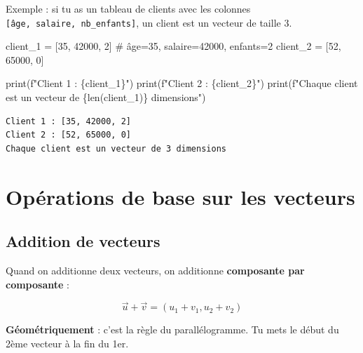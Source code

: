 \documentclass[
  french,
  11pt,
  a4paper,
]{scrbook}
\newenvironment{Shaded}{}{}
\newcommand{\BuiltInTok}[1]{\textcolor[rgb]{0.84,0.23,0.29}{#1}}
\newcommand{\CommentTok}[1]{\textcolor[rgb]{0.42,0.45,0.49}{#1}}
\newcommand{\DecValTok}[1]{\textcolor[rgb]{0.00,0.36,0.77}{#1}}
\newcommand{\NormalTok}[1]{\textcolor[rgb]{0.14,0.16,0.18}{#1}}
\newcommand{\OperatorTok}[1]{\textcolor[rgb]{0.14,0.16,0.18}{#1}}
\newcommand{\SpecialCharTok}[1]{\textcolor[rgb]{0.00,0.36,0.77}{#1}}
\newcommand{\SpecialStringTok}[1]{\textcolor[rgb]{0.01,0.18,0.38}{#1}}
\begin{document}
Exemple : si tu as un tableau de clients avec les colonnes
\texttt{{[}âge,\ salaire,\ nb\_enfants{]}}, un client est un vecteur de
taille 3.

\begin{Shaded}
\begin{Highlighting}[]
\NormalTok{client\_1 }\OperatorTok{=}\NormalTok{ [}\DecValTok{35}\NormalTok{, }\DecValTok{42000}\NormalTok{, }\DecValTok{2}\NormalTok{]   }\CommentTok{\# âge=35, salaire=42000, enfants=2}
\NormalTok{client\_2 }\OperatorTok{=}\NormalTok{ [}\DecValTok{52}\NormalTok{, }\DecValTok{65000}\NormalTok{, }\DecValTok{0}\NormalTok{]}

\BuiltInTok{print}\NormalTok{(}\SpecialStringTok{f"Client 1 : }\SpecialCharTok{\{}\NormalTok{client\_1}\SpecialCharTok{\}}\SpecialStringTok{"}\NormalTok{)}
\BuiltInTok{print}\NormalTok{(}\SpecialStringTok{f"Client 2 : }\SpecialCharTok{\{}\NormalTok{client\_2}\SpecialCharTok{\}}\SpecialStringTok{"}\NormalTok{)}
\BuiltInTok{print}\NormalTok{(}\SpecialStringTok{f"Chaque client est un vecteur de }\SpecialCharTok{\{}\BuiltInTok{len}\NormalTok{(client\_1)}\SpecialCharTok{\}}\SpecialStringTok{ dimensions"}\NormalTok{)}
\end{Highlighting}
\end{Shaded}

\begin{verbatim}
Client 1 : [35, 42000, 2]
Client 2 : [52, 65000, 0]
Chaque client est un vecteur de 3 dimensions
\end{verbatim}

\chapter{Opérations de base sur les
vecteurs}\label{opuxe9rations-de-base-sur-les-vecteurs}

\section{Addition de vecteurs}\label{addition-de-vecteurs}

Quand on additionne deux vecteurs, on additionne \textbf{composante par
composante} :

\[\vec{u} + \vec{v} = (u_1 + v_1, u_2 + v_2)\]

\textbf{Géométriquement} : c'est la règle du parallélogramme. Tu mets le
début du 2ème vecteur à la fin du 1er.
\end{document}
